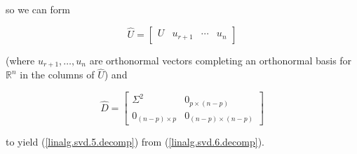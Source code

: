 so we can form 

\[
\hat{U} = \begin{bmatrix} U & u_{r+1} & \cdots & u_n \end{bmatrix}
\] 

(where \(u_{r+1}, \ldots, u_n\) are orthonormal vectors completing an orthonormal basis for \(\mathbb{R}^n\) in the columns of \(\hat{U}\)) and

\[
\hat{D} = \begin{bmatrix}
\Sigma^2 & 0_{p \times (n-p)} \\
0_{ (n-p) \times p} & 0_{(n-p) \times (n-p)} 
\end{bmatrix}
\]

to yield (\ref{linalg.svd.5.decomp}) from (\ref{linalg.svd.6.decomp}).



